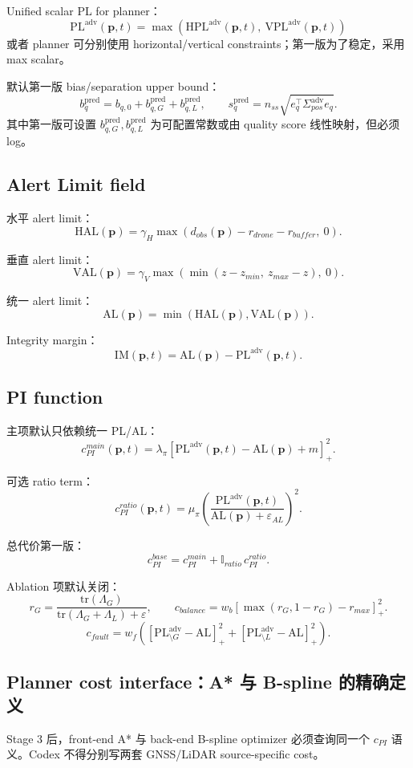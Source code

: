 \documentclass[11pt,a4paper]{article}
\newcommand{\PL}{\mathrm{PL}}
\newcommand{\AL}{\mathrm{AL}}
\newcommand{\IM}{\mathrm{IM}}
\newcommand{\HPL}{\mathrm{HPL}}
\newcommand{\VPL}{\mathrm{VPL}}
\newcommand{\HAL}{\mathrm{HAL}}
\newcommand{\VAL}{\mathrm{VAL}}
\newcommand{\Lam}{\Lambda}
\newcommand{\Sig}{\Sigma}
\newcommand{\pvec}{\mathbf{p}}
\newcommand{\eps}{\varepsilon}
\newcommand{\adv}{\mathrm{adv}}
\newcommand{\pred}{\mathrm{pred}}
\newcommand{\tr}{\mathrm{tr}}
\begin{document}
Unified scalar PL for planner：
\[
\boxed{
  \PL^{\adv}(\pvec,t)=\max\left(\HPL^{\adv}(\pvec,t),\ \VPL^{\adv}(\pvec,t)\right)
}
\]
或者 planner 可分别使用 horizontal/vertical constraints；第一版为了稳定，采用 max scalar。

默认第一版 bias/separation upper bound：
\[
b_q^{\pred}=b_{q,0}+b_{q,G}^{\pred}+b_{q,L}^{\pred},
\qquad
s_q^{\pred}=n_{ss}\sqrt{e_q^\top\Sig^{\adv}_{pos}e_q}.
\]
其中第一版可设置 $b_{q,G}^{\pred}, b_{q,L}^{\pred}$ 为可配置常数或由 quality score 线性映射，但必须 log。

\subsection{Alert Limit field}

水平 alert limit：
\[
\HAL(\pvec)=\gamma_H\max\left(d_{obs}(\pvec)-r_{drone}-r_{buffer},\ 0\right).
\]

垂直 alert limit：
\[
\VAL(\pvec)=\gamma_V\max\left(\min(z-z_{min},\ z_{max}-z),\ 0\right).
\]

统一 alert limit：
\[
\boxed{
  \AL(\pvec)=\min(\HAL(\pvec),\VAL(\pvec)).
}
\]

Integrity margin：
\[
\boxed{
  \IM(\pvec,t)=\AL(\pvec)-\PL^{\adv}(\pvec,t).
}
\]

\subsection{PI function}

主项默认只依赖统一 PL/AL：
\[
\boxed{
  c^{main}_{PI}(\pvec,t)
  =
  \lambda_\pi\left[\PL^{\adv}(\pvec,t)-\AL(\pvec)+m\right]_+^2.
}
\]

可选 ratio term：
\[
c^{ratio}_{PI}(\pvec,t)
=\mu_\pi\left(\frac{\PL^{\adv}(\pvec,t)}{\AL(\pvec)+\eps_{AL}}\right)^2.
\]

总代价第一版：
\[
\boxed{
  c_{PI}^{base}=c_{PI}^{main}+\mathbb{I}_{ratio}\,c_{PI}^{ratio}.
}
\]

Ablation 项默认关闭：
\[
r_G=\frac{\tr(\Lam_G)}{\tr(\Lam_G+\Lam_L)+\eps},
\qquad
c_{balance}=w_b[\max(r_G,1-r_G)-r_{max}]_+^2.
\]
\[
c_{fault}=w_f\left([\PL^{\adv}_{\setminus G}-\AL]_+^2+[\PL^{\adv}_{\setminus L}-\AL]_+^2\right).
\]


\subsection{Planner cost interface：A* 与 B-spline 的精确定义}

Stage 3 后，front-end A* 与 back-end B-spline optimizer 必须查询同一个 $c_{PI}$ 语义。Codex 不得分别写两套 GNSS/LiDAR source-specific cost。
\end{document}
